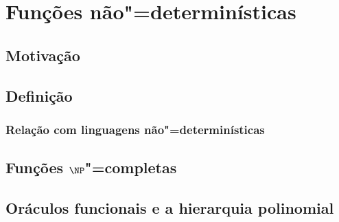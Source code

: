 \chapter{Funções não"=determinísticas}


\section{Motivação}
\section{Definição}
\subsection{Relação com linguagens não"=determinísticas}
\section{Funções $\NP$"=completas}
\section{Oráculos funcionais e a hierarquia polinomial}
